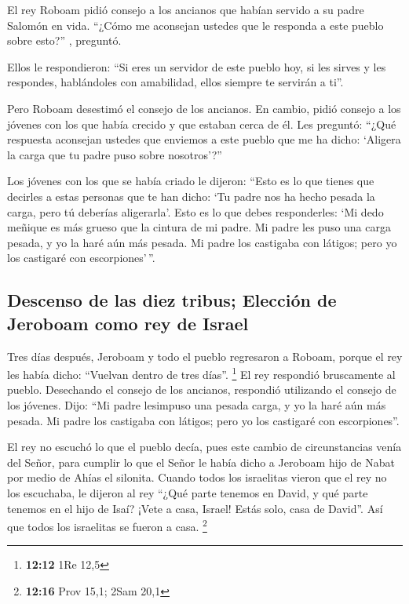  El rey Roboam pidió consejo a los ancianos que habían
servido a su padre Salomón en vida. ``¿Cómo me aconsejan ustedes que le
responda a este pueblo sobre esto?'' , preguntó.

 Ellos le respondieron: ``Si eres un servidor de este
pueblo hoy, si les sirves y les respondes, hablándoles con amabilidad,
ellos siempre te servirán a ti''.

 Pero Roboam desestimó el consejo de los ancianos. En
cambio, pidió consejo a los jóvenes con los que había crecido y que
estaban cerca de él.  Les preguntó: ``¿Qué respuesta
aconsejan ustedes que enviemos a este pueblo que me ha dicho: `Aligera
la carga que tu padre puso sobre nosotros'?''

 Los jóvenes con los que se había criado le dijeron:
``Esto es lo que tienes que decirles a estas personas que te han dicho:
`Tu padre nos ha hecho pesada la carga, pero tú deberías aligerarla'.
Esto es lo que debes responderles: `Mi dedo meñique es más grueso que la
cintura de mi padre.  Mi padre les puso una carga pesada,
y yo la haré aún más pesada. Mi padre los castigaba con látigos; pero yo
los castigaré con escorpiones'\,''.

\hypertarget{descenso-de-las-diez-tribus-elecciuxf3n-de-jeroboam-como-rey-de-israel}{%
\subsection{Descenso de las diez tribus; Elección de Jeroboam como rey
de
Israel}\label{descenso-de-las-diez-tribus-elecciuxf3n-de-jeroboam-como-rey-de-israel}}

 Tres días después, Jeroboam y todo el pueblo regresaron
a Roboam, porque el rey les había dicho: ``Vuelvan dentro de tres
días''. \footnote{\textbf{12:12} 1Re 12,5}  El rey
respondió bruscamente al pueblo. Desechando el consejo de los ancianos,
 respondió utilizando el consejo de los jóvenes. Dijo:
``Mi padre lesimpuso una pesada carga, y yo la haré aún más pesada. Mi
padre los castigaba con látigos; pero yo los castigaré con
escorpiones''.

 El rey no escuchó lo que el pueblo decía, pues este
cambio de circunstancias venía del Señor, para cumplir lo que el Señor
le había dicho a Jeroboam hijo de Nabat por medio de Ahías el silonita.
 Cuando todos los israelitas vieron que el rey no los
escuchaba, le dijeron al rey ``¿Qué parte tenemos en David, y qué parte
tenemos en el hijo de Isaí? ¡Vete a casa, Israel! Estás solo, casa de
David''. Así que todos los israelitas se fueron a casa. \footnote{\textbf{12:16}
  Prov 15,1; 2Sam 20,1}

